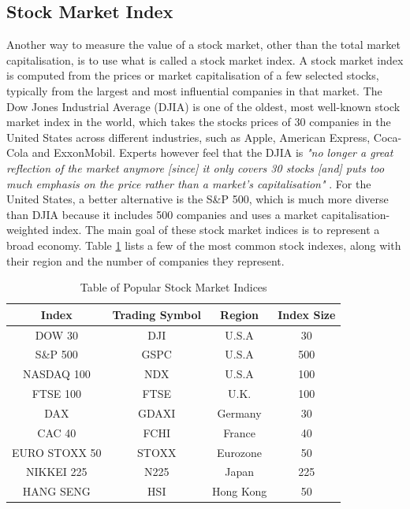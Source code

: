 \documentclass{UoYCSproject}
\begin{document}
\subsection{Stock Market Index}
Another way to measure the value of a stock market, other than the total market capitalisation, is to use what is called a stock market index. A stock market index is computed from the prices or market capitalisation of a few selected stocks, typically from the largest and most influential companies in that market. The Dow Jones Industrial Average (DJIA) is one of the oldest, most well-known stock market index in the world, which takes the stocks prices of 30 companies in the United States across different industries, such as Apple, American Express, Coca-Cola and ExxonMobil. Experts however feel that the DJIA is \textit{"no longer a great reflection of the market anymore [since] it only covers 30 stocks [and] puts too much emphasis on the price rather than a market's capitalisation"} \cite{dowproblem}. For the United States, a better alternative is the S\&P 500, which is much more diverse than DJIA because it includes 500 companies and uses a market capitalisation-weighted index. The main goal of these stock market indices is to represent a broad economy. Table \ref{tab:indices} lists a few of the most common stock indexes, along with their region and the number of companies they represent. 

\begin{table}[h]
    \centering
    \begin{tabular}{|c|c|c|c|} \hline
        \textbf{Index} & \textbf{Trading Symbol} & \textbf{Region} & \textbf{Index Size} \\ \hline
        DOW 30 & DJI & U.S.A & 30 \\
        S\&P 500 & GSPC & U.S.A & 500 \\
        NASDAQ 100 & NDX & U.S.A & 100 \\
        FTSE 100 & FTSE & U.K. & 100 \\
        DAX & GDAXI & Germany & 30 \\
        CAC 40 & FCHI & France & 40 \\
        EURO STOXX 50 & STOXX & Eurozone & 50 \\
        NIKKEI 225 & N225 & Japan & 225 \\
        HANG SENG & HSI & Hong Kong & 50 \\
        \hline
    \end{tabular}
    \caption{Table of Popular Stock Market Indices}
    \label{tab:indices}
\end{table}
\end{document}
